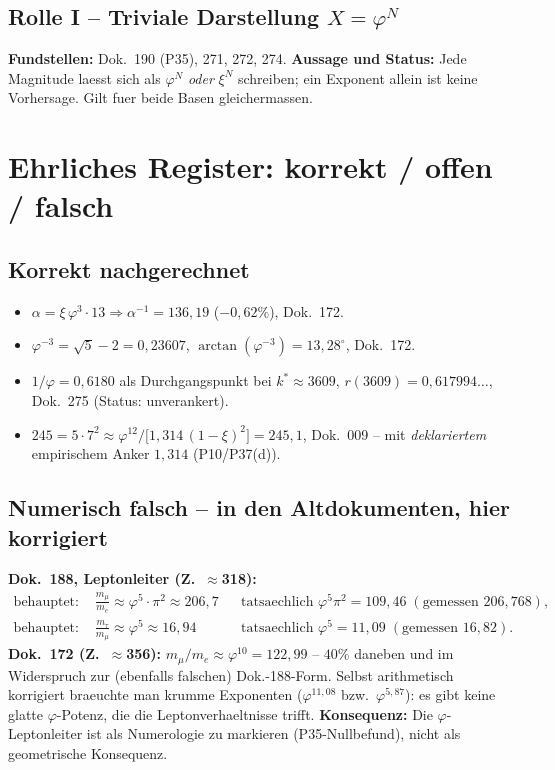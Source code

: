 \subsection{Rolle I -- Triviale Darstellung $X=\varphi^N$}
\textbf{Fundstellen:} Dok.~190 (P35), 271, 272, 274. \textbf{Aussage und
Status:} Jede Magnitude laesst sich als $\varphi^N$ \emph{oder} $\xi^N$
schreiben; ein Exponent allein ist keine Vorhersage. Gilt fuer beide Basen
gleichermassen.

\section{Ehrliches Register: korrekt / offen / falsch}\label{sec:fehler}

\subsection{Korrekt nachgerechnet}
\begin{itemize}
  \item $\alpha = \xi\,\varphi^3\cdot13 \Rightarrow \alpha^{-1}=136{,}19$
        ($-0{,}62\%$), Dok.~172.
  \item $\varphi^{-3}=\sqrt5-2=0{,}23607$, $\arctan(\varphi^{-3})=13{,}28^\circ$,
        Dok.~172.
  \item $1/\varphi=0{,}6180$ als Durchgangspunkt bei $k^*\approx3609$,
        $r(3609)=0{,}617994\ldots$, Dok.~275 (Status: unverankert).
  \item $245 = 5\cdot7^2 \approx \varphi^{12}/\bigl[1{,}314\,(1-\xi)^2\bigr] = 245{,}1$, Dok.~009 --
        mit \emph{deklariertem} empirischem Anker $1{,}314$ (P10/P37(d)).
\end{itemize}

\subsection{Numerisch falsch -- in den Altdokumenten, hier korrigiert}
\begin{critical}
\textbf{Dok.~188, Leptonleiter (Z.~$\approx$318):}
\begin{align}
  \text{behauptet: } & \frac{m_\mu}{m_e}\approx\varphi^5\cdot\pi^2\approx 206{,}7
    && \text{tatsaechlich } \varphi^5\pi^2 = 109{,}46 \;(\text{gemessen }206{,}768),\\
  \text{behauptet: } & \frac{m_\tau}{m_\mu}\approx\varphi^5\approx 16{,}94
    && \text{tatsaechlich } \varphi^5 = 11{,}09 \;(\text{gemessen }16{,}82).
\end{align}
\textbf{Dok.~172 (Z.~$\approx$356):} $m_\mu/m_e\approx\varphi^{10}=122{,}99$ --
$40\%$ daneben und im Widerspruch zur (ebenfalls falschen) Dok.-188-Form.
Selbst arithmetisch korrigiert braeuchte man krumme Exponenten
($\varphi^{11{,}08}$ bzw.\ $\varphi^{5{,}87}$): es gibt keine glatte
$\varphi$-Potenz, die die Leptonverhaeltnisse trifft.
\textbf{Konsequenz:} Die $\varphi$-Leptonleiter ist als Numerologie zu
markieren (P35-Nullbefund), nicht als geometrische Konsequenz.
\end{critical}

